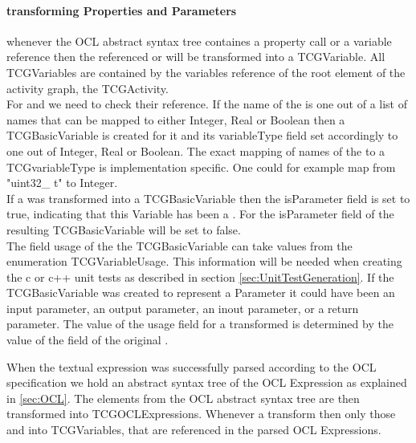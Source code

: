 \paragraph{transforming Properties and Parameters}
whenever the OCL abstract syntax tree containes a property call or a variable reference then the referenced  or  will be transformed into a TCGVariable. All TCGVariables are contained by the variables reference of the root element of the activity graph, the TCGActivity.\\
For  and  we need to check their  reference. If the name of the  is one out of a list of names that can be mapped to either Integer, Real or Boolean then a TCGBasicVariable is created for it and its variableType field set accordingly to one out of Integer, Real or Boolean. The exact mapping of names of the  to a TCGvariableType is implementation specific. One could for example map from "uint32\_ t" to Integer.\\
If a  was transformed into a TCGBasicVariable then the isParameter field is set to true, indicating that this Variable has been a . For  the isParameter field of the resulting TCGBasicVariable will be set to false.\\
The field usage of the the TCGBasicVariable can take values from the enumeration TCGVariableUsage. This information will be needed when creating the c or c++ unit tests as described in section \ref{sec:UnitTestGeneration}. If the TCGBasicVariable was created to represent a Parameter it could have been an input parameter, an output parameter, an inout parameter, or a return parameter. The value of the usage field for a transformed  is determined by the value of the  field of the original .



 When the textual expression was successfully parsed according to the OCL specification we hold an abstract syntax tree of the OCL Expression as explained in \ref{sec:OCL}. The elements from the OCL abstract syntax tree are then transformed into TCGOCLExpressions. Whenever a 
transform then only those  and  into TCGVariables, that are referenced in the parsed OCL Expressions.\\ 

